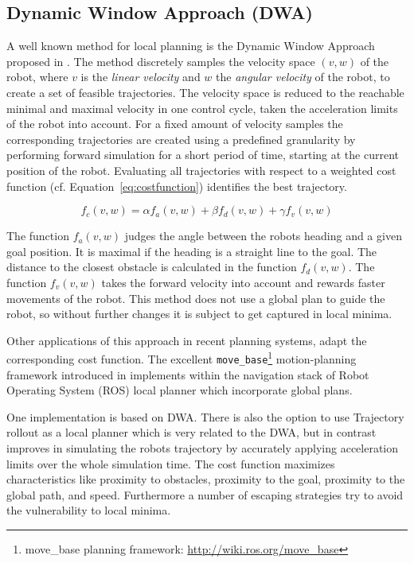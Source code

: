 \subsection{Dynamic Window Approach (DWA)}
A well known method for local planning is the Dynamic Window Approach proposed in \cite{DWA1997}. 
The method discretely samples the velocity space $(v,w)$ of the robot, where $v$ is the \emph{linear velocity} and $w$ the \emph{angular velocity} of the robot, to create a set of feasible trajectories.
The velocity space is reduced to the reachable minimal and maximal velocity in one control cycle, taken the acceleration limits of the robot into account.
For a fixed amount of velocity samples the corresponding trajectories are created using a predefined granularity by performing forward simulation for a short period of time, starting at the current position of the robot. Evaluating all trajectories with respect to a weighted cost function (cf. Equation~\ref{eq:costfunction}) identifies the best trajectory.

\begin{equation}
   f_c(v,w)=\alpha f_a(v,w)+\beta f_d(v,w)+\gamma f_v(v,w)
   \label{eq:costfunction}
\end{equation}

The function $f_a(v,w)$ judges the angle between the robots heading and a given goal position.
It is maximal if the heading is a straight line to the goal.
The distance to the closest obstacle is calculated in the function $f_d(v,w)$.
The function $f_v(v,w)$ takes the forward velocity into account and rewards faster movements of the robot.
This method does not use a global plan to guide the robot, so without further changes it is subject to get captured in local minima.

Other applications of this approach in recent planning systems, adapt the corresponding cost function. 
The excellent \texttt{move\_base}\footnote{move\_base planning framework: \url{http://wiki.ros.org/move_base}} motion-planning framework introduced in \cite{DBLP:conf/icra/Marder-EppsteinBFGK10} implements within the navigation stack of Robot Operating System (ROS) local planner which incorporate global plans.

One implementation is based on DWA.
There is also the option to use Trajectory rollout \cite{gerkey08planning} as a local planner which is very related to the DWA, but in contrast improves in simulating the robots trajectory by accurately applying acceleration limits over the whole simulation time.
The cost function maximizes characteristics like proximity to obstacles, proximity to the goal, proximity to the global path, and speed.
Furthermore a number of escaping strategies try to avoid the vulnerability to local minima. 

